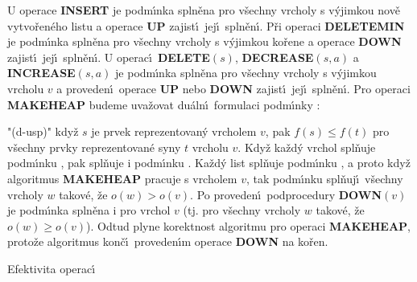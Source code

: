 \flushpar U operace {\bf INSERT} je podm\'\i nka  spln\v ena pro v\v sechny vrcholy s v\'yjimkou nov\v e vytvo\v ren\'eho listu a operace {\bf UP} zajist\'\i\ jej\'\i\ spln\v en\'\i .  P\v ri operaci {\bf DELETEMIN} je pod\-m\'\i n\-ka  spln\v ena pro v\v sechny vrcholy s v\'yjimkou 
ko\v rene a operace {\bf DOWN} zajist\'\i\ jej\'\i\ spln\v en\'\i.  U 
operac\'\i\ {\bf DE\-LE\-TE$(s)$}, {\bf DECREASE$(s,a)$} a {\bf INCREASE$(s,a
)$} je pod\-m\'\i n\-ka  spln\v ena pro v\v sechny vrcholy s 
v\'yjimkou vrcholu $v$ a proveden\'\i\ operace {\bf UP} nebo {\bf DOWN} 
zajist\'\i\ jej\'\i\ spln\v en\'\i .  Pro operaci {\bf MAKEHEAP} budeme 
uva\v zovat du\'aln\'\i\ formulaci podm\'\i nky :
\roster
\item"{(d-usp)}"
kdy\v z $s$ je prvek reprezentovan\'y vrcholem $v$, pak 
$f(s)\le f(t)$ pro v\v sechny prvky reprezentovan\'e syny $t$
vrcholu $v$. 
\endroster
Kdy\v z ka\v zd\'y vrchol spl\v nuje podm\'\i nku , pak 
spl\v nuje i 
pod\-m\'\i nku .  Ka\v zd\'y list spl\v nuje podm\'\i nku 
, a proto kdy\v z algoritmus {\bf MAKEHEAP} pracuje s 
vrcholem $v$, tak podm\'\i nku  spl\v nuj\'\i\ v\v sechny 
vrcholy $w$ takov\'e, \v ze $o(w)>o(v)$.  Po proveden\'\i\ podprocedury 
{\bf DOWN$(v)$} je podm\'\i nka  spln\v ena i pro vrchol $
v$ (tj.  
pro v\v sechny vrcholy $w$ takov\'e, \v ze $o(w)\ge o(v)$).  Odtud plyne 
korektnost algoritmu pro operaci {\bf MAKEHEAP}, proto\v ze 
algoritmus kon\v c\'\i\ proveden\'\i m operace {\bf DOWN} na ko\v ren.  
\medskip

\subhead 
Efektivita operac\'\i
\endsubhead
\smallskip 

